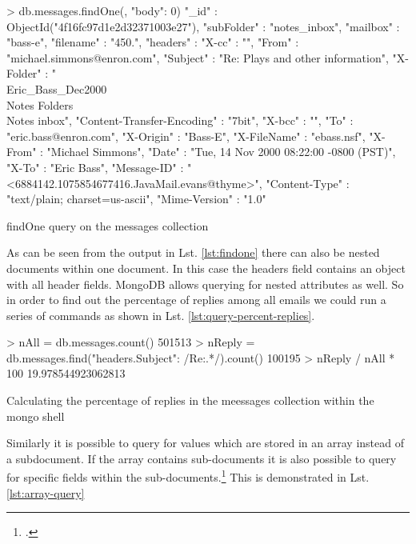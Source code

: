 \begin{listing}
    \begin{javascriptcode}
> db.messages.findOne({}, {"body": 0})
{
    "_id" : ObjectId("4f16fc97d1e2d32371003e27"),
    "subFolder" : "notes_inbox",
    "mailbox" : "bass-e",
    "filename" : "450.",
    "headers" : {
        "X-cc" : "",
        "From" : "michael.simmons@enron.com",
        "Subject" : "Re: Plays and other information",
        "X-Folder" : "\\Eric_Bass_Dec2000\\Notes Folders\\Notes inbox",
        "Content-Transfer-Encoding" : "7bit",
        "X-bcc" : "",
        "To" : "eric.bass@enron.com",
        "X-Origin" : "Bass-E",
        "X-FileName" : "ebass.nsf",
        "X-From" : "Michael Simmons",
        "Date" : "Tue, 14 Nov 2000 08:22:00 -0800 (PST)",
        "X-To" : "Eric Bass",
        "Message-ID" : "<6884142.1075854677416.JavaMail.evans@thyme>",
        "Content-Type" : "text/plain; charset=us-ascii",
        "Mime-Version" : "1.0"
    }
}
    \end{javascriptcode}
    \caption{findOne query on the messages collection}
    \label{lst:findone}
\end{listing}

As can be seen from the output in Lst. \ref{lst:findone} there can also be nested documents
within one document. In this case the headers field contains an object with all header fields.
MongoDB allows querying for nested attributes as well. So in order to find out the percentage of
replies among all emails we could run a series of commands as shown in Lst. \ref{lst:query-percent-replies}.

\begin{listing}
    \begin{javascriptcode}
> nAll = db.messages.count()
501513
> nReply = db.messages.find({"headers.Subject": /Re:.*/}).count()
100195
> nReply / nAll * 100
19.978544923062813
    \end{javascriptcode}
    \caption[Calculating the percentage of replies]{Calculating the percentage of replies in the meessages collection within the mongo shell}
    \label{lst:query-percent-replies}
\end{listing}

Similarly it is possible to query for values which are stored in an array
instead of a subdocument.
If the array contains sub-documents it is also possible to query for specific
fields within the sub-documents.\footcite[Cf.][10]{mongo_crud_manual} This is
demonstrated in Lst. \ref{lst:array-query}

